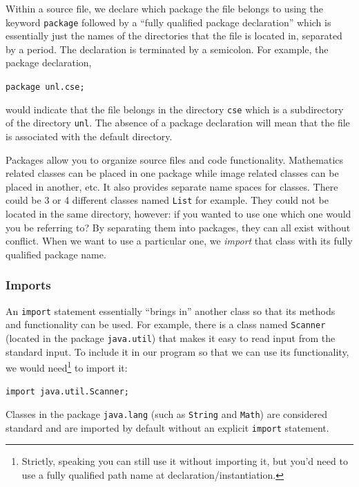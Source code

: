 Within a source file, we declare which package the file belongs to using
the keyword \texttt{package} followed by a ``fully qualified
package declaration'' which is essentially just the names of the directories
that the file is located in, separated by a period.  The declaration is terminated
by a semicolon.  For example, the package declaration, 

\texttt{package unl.cse;}

would indicate that the file belongs in the directory \texttt{cse}
which is a subdirectory of the directory \texttt{unl}.  The
absence of a package declaration will mean that the file is associated
with the default directory.  

Packages allow you to organize source files and code functionality.  
Mathematics related classes can be placed in one package while 
image related classes can be placed in another, etc.  It also provides
separate name spaces for classes.  There could be 3 or 4 different
classes named \texttt{List} for example.  They could not
be located in the same directory, however: if you wanted to use one
which one would you be referring to?  By separating them into 
packages, they can all exist without conflict.  When we want to
use a particular one, we \emph{import} that class with its fully
qualified package name.

\subsubsection{Imports}

An \texttt{import} statement essentially ``brings in'' another
class so that its methods and functionality can be used.  For example, 
there is a class named \texttt{Scanner} (located in the
package \texttt{java.util}) that makes it easy to read input
from the standard input.  To include it in our program so that we can
use its functionality, we would need\footnote{Strictly, speaking you
can still use it without importing it, but you'd need to use a fully
qualified path name at declaration/instantiation.} to import it: 

\texttt{import java.util.Scanner;}

Classes in the package \texttt{java.lang} (such as 
\texttt{String} and \texttt{Math}) are 
considered standard and are imported by default without an 
explicit \texttt{import} statement.  

